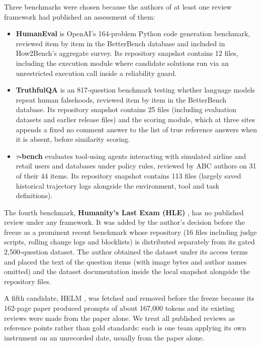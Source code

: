 \documentclass[10pt,conference]{IEEEtran}
\begin{document}
Three benchmarks were chosen because the authors of at least one review framework had published an assessment of them:
\begin{itemize}
\item \textbf{HumanEval} \cite{human_eval_repository} is OpenAI's 164-problem Python code generation benchmark, reviewed item by item in the BetterBench database and included in How2Bench's aggregate survey. Its repository snapshot contains 12 files, including the execution module where candidate solutions run via an unrestricted execution call inside a reliability guard.
\item \textbf{TruthfulQA} \cite{truthfulqa_repository} is an 817-question benchmark testing whether language models repeat human falsehoods, reviewed item by item in the BetterBench database. Its repository snapshot contains 25 files (including evaluation datasets and earlier release files) and the scoring module, which at three sites appends a fixed no comment answer to the list of true reference answers when it is absent, before similarity scoring.
\item \textbf{$\tau$-bench} \cite{tau_bench_repository} evaluates tool-using agents interacting with simulated airline and retail users and databases under policy rules, reviewed by ABC authors on 31 of their 44 items. Its repository snapshot contains 113 files (largely saved historical trajectory logs alongside the environment, tool and task definitions).
\end{itemize}

The fourth benchmark, \textbf{Humanity's Last Exam (HLE)} \cite{phan_etal_hle_2025}, has no published review under any framework. It was added by the author's decision before the freeze as a prominent recent benchmark whose repository (16 files including judge scripts, rolling change logs and blocklists) is distributed separately from its gated 2,500-question dataset. The author obtained the dataset under its access terms and placed the text of the question items (with image bytes and author names omitted) and the dataset documentation inside the local snapshot alongside the repository files.

A fifth candidate, HELM \cite{liang_helm_2022}, was fetched and removed before the freeze because its 162-page paper produced prompts of about 167,000 tokens and its existing reviews were made from the paper alone. We treat all published reviews as reference points rather than gold standards: each is one team applying its own instrument on an unrecorded date, usually from the paper alone.
\end{document}
